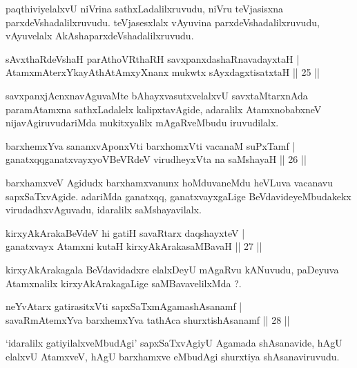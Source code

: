 \begin{artha}
paqthiviyelalxvU niVrina sathxLadalilxruvudu, niVru teVjasisxna parxdeVshadalilxruvudu. teVjasesxlalx vAyuvina parxdeVshadalilxruvudu, vAyuvelalx AkAshaparxdeVshadalilxruvudu.
\end{artha}

\begin{shl}
sAvxthaRdeVshaH parAthoVR\s thaRH savxpanxdashaRnavadayxtaH |\\
AtamxmAterxYkayAthAtAmxyXnanx mukwtx sAyxdagxtisatxtaH \hfill || 25 || 
\end{shl}

\begin{artha}
savxpanxjAcnxnavAguvaMte bAhayxvasutxvelalxvU savxtaMtarxnAda paramAtamxna sathxLadalelx kalipxtavAgide, adaralilx AtamxnobabxneV nijavAgiruvudariMda mukitxyalilx mAgaRveMbudu iruvudilalx.
\end{artha}

\begin{shl}
barxhemxYva sananxvAponxVti barxhomxVti vacanaM suPxTamf |\\
ganatxqqganatxvayxyoVBeVRdeV virudheyxVta na saMshayaH \hfill || 26 || 
\end{shl}

\begin{artha}
barxhamxveV Agidudx barxhamxvanunx hoMduvaneMdu heVLuva vacanavu sapxSaTxvAgide. adariMda ganatxqq, ganatxvayxgaLige BeVdavideyeMbudakekx virudadhxvAguvadu, idaralilx saMshayavilalx.
\end{artha}

\begin{shl}
kirxyAkArakaBeVdeV hi gatiH savaRtarx daqshayxteV |\\
ganatxvayx Atamxni kutaH kirxyAkArakasaMBavaH \hfill || 27 || 
\end{shl}

\begin{artha}
kirxyAkArakagala BeVdavidadxre elalxDeyU mAgaRvu kANuvudu, paDeyuva Atamxnalilx kirxyAkArakagaLige saMBavavelilxMda ?.
\end{artha}

\begin{shl}
neYvAtarx gatirasitxVti sapxSaTxmAgamashAsanamf |\\
savaRmAtemxYva barxhemxYva tathAca shurxtishAsanamf \hfill || 28 || 
\end{shl}

\begin{artha}
`idaralilx gatiyilalxveMbudAgi' sapxSaTxvAgiyU Agamada shAsanavide, hAgU elalxvU AtamxveV, hAgU barxhamxve eMbudAgi shurxtiya shAsanaviruvudu.
\end{artha}

